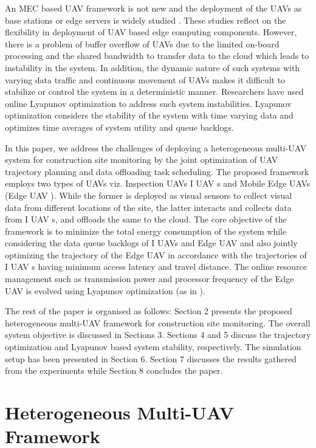 \documentclass{article}
\begin{document}
\begin{multicols}{2}
An MEC based UAV framework is not new and the deployment of the UAVs as base stations or edge servers is widely studied \cite{wan2019towards, abbas2017mobile}. These studies reflect on the flexibility in deployment of UAV based edge computing components. However, there is a problem of buffer overflow of UAVs due to the limited on-board processing and the shared bandwidth to transfer data to the cloud which leads to instability in the system. In addition, the dynamic nature of such systems with varying data traffic and continuous movement of UAVs makes it difficult to stabilize or control the system in a deterministic manner. Researchers have used online Lyapunov optimization\cite{neely2010stochastic} to address such system instabilities. Lyapunov optimization considers the stability of the system with time varying data and optimizes time averages of system utility and queue backlogs.\par

In this paper, we address the challenges of deploying a heterogeneous multi-UAV system for construction site monitoring by the joint optimization of UAV trajectory planning and data offloading task scheduling. The proposed framework employs two types of UAVs viz. Inspection UAVs I UAV s and Mobile Edge UAVs (Edge UAV ). While the former is deployed as visual sensors to collect visual data from different locations of the site, the latter interacts and collects data from I UAV s, and offloads the same to the cloud. The core objective of the framework is to minimize the total energy consumption of the system while considering the data queue backlogs of I UAVs and Edge UAV and also jointly optimizing the trajectory of the Edge UAV in accordance with the trajectories of I UAV s having minimum access latency and travel distance. The online resource management such as transmission power and processor frequency of the Edge UAV is
evolved using Lyapunov optimization (as in \cite{zhang2018stochastic}).\par

The rest of the paper is organised as follows: Section 2 presents the proposed heterogeneous multi-UAV framework for construction site monitoring. The overall system objective is discussed in Sections 3. Sections 4 and 5 discuss the trajectory optimization and Lyapunov based system stability, respectively. The simulation setup has been presented in Section 6. Section 7 discusses the results gathered from the experiments while Section 8 concludes
the paper.

\section{Heterogeneous Multi-UAV Framework}


\end{multicols}
\end{document}
